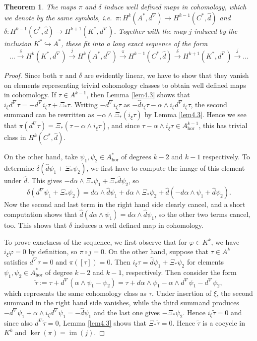 \documentclass[12pt,a4paper]{amsart}
\let\phi\varphi
\renewcommand{\o}{\circ}
\newcommand{\al}{\alpha}
\newcommand{\de}{\delta}
\newcommand{\ph}{\phi}
\newcommand{\ps}{\psi}
\newcommand{\im}{\operatorname{im}}
\newcommand{\hor}{\text{hor}}
\newcounter{theorem}
\numberwithin{theorem}{section}
\newtheorem{thm}[theorem]{Theorem}
\theoremstyle{definition}
\theoremstyle{remark}
\begin{document}
\begin{thm}\label{thm4.4}
  The maps $\pi$ and $\delta$ induce well defined maps in cohomology,
  which we denote by the same symbols, i.e.~$\pi:H^k(A^*,d^\nabla)\to
  H^{k-1}(C^*,\hat d)$ and $\delta:H^{k-1}(C^*,\hat d)\to
  H^{k+1}(K^*,d^\nabla)$. Together with the map $j$ induced by the
  inclusion $K^*\hookrightarrow A^*$, these fit into a long exact
  sequence of the form
$$
\dots\overset{\delta}{\to} H^k(K^*,d^\nabla)\overset{j}{\to}
H^k(A^*,d^\nabla) \overset{\pi}{\to} H^{k-1}(C^*,\hat d)
\overset{\delta}{\to} H^{k+1}(K^*,d^{\nabla})\overset{j}{\to}\dots
$$
\end{thm}
\begin{proof}
  Since both $\pi$ and $\delta$ are evidently linear, we have to show
  that they vanish on elements representing trivial cohomology classes
  to obtain well defined maps in cohomology. If $\tau\in A^{k-1}$,
  then Lemma \ref{lem4.3} shows that $i_\xi d^\nabla\tau=-d^\nabla
  i_\xi\tau+\Xi_*\tau$. Writing $-d^\nabla i_\xi\tau$ as $-\hat
  di_\xi\tau-\al\wedge i_\xi d^\nabla i_\xi\tau$, the second summand
  can be rewritten as $-\al\wedge \Xi_*(i_\xi\tau)$ by Lemma
  \ref{lem4.3}. Hence we see that $\pi(d^\nabla\tau)=\Xi_*(\tau-\al\wedge
  i_\xi\tau)$, and since $\tau-\al\wedge i_\xi\tau\in A^{k-1}_\hor$,
  this has trivial class in $H^k(C^*,\hat d)$.

  On the other hand, take $\ps_1,\ps_2\in A^*_\hor$ of degrees $k-2$
  and $k-1$ respectively. To determine $\de(\hat d\ps_1+\Xi_*\ps_2)$,
  we first have to compute the image of this element under $\hat
  d$. This gives $-d\al\wedge \Xi_*\ps_1+\Xi_*\hat d\ps_2$, so
$$
\de(d^\nabla\ps_1+\Xi_*\ps_2)=d\al\wedge
\hat d\ps_1+d\al\wedge\Xi_*\ps_2+\hat d(-d\al\wedge\ps_1+\hat d\ps_2).  
$$ 
Now the second and last term in the right hand side clearly cancel,
and a short computation shows that $ \hat
d(d\al\wedge\ps_1)=d\al\wedge\hat d\ps_1$, so the other two terms
cancel, too. This shows that $\delta$ induces a well defined map in
cohomology.

To prove exactness of the sequence, we first observe that for $\ph\in
K^k$, we have $i_\xi\ph=0$ by definition, so $\pi\o j=0$. On the other
hand, suppose that $\tau\in A^k$ satisfies $d^\nabla\tau=0$ and
$\pi([\tau])=0$. Then $i_\xi\tau=\hat d\ps_1+\Xi_*\ps_2$ for elements
$\ps_1,\ps_2\in A^*_\hor$ of degree $k-2$ and $k-1$,
respectively. Then consider the form
$$
\tilde\tau:=\tau+d^\nabla(\al\wedge\ps_1-\ps_2)=\tau+d\al\wedge\ps_1-\al\wedge d^\nabla\ps_1-d^\nabla\ps_2,
$$ 
which represents the same cohomology class as $\tau$. Under insertion
of $\xi$, the second summand in the right hand side vanishes, while
the third summand produces $-d^\nabla\ps_1+\al\wedge i_\xi
d^\nabla\ps_1=-\hat d\ps_1$ and the last one gives
$-\Xi_*\ps_2$. Hence $i_\xi\tilde\tau=0$ and since also
$d^\nabla\tilde\tau=0$, Lemma \ref{lem4.3} shows that
$\Xi_*\tilde\tau=0$. Hence $\tilde\tau$ is a cocycle in $K^k$ and
$\ker(\pi)=\im(j)$.


\end{proof}
\end{document}
